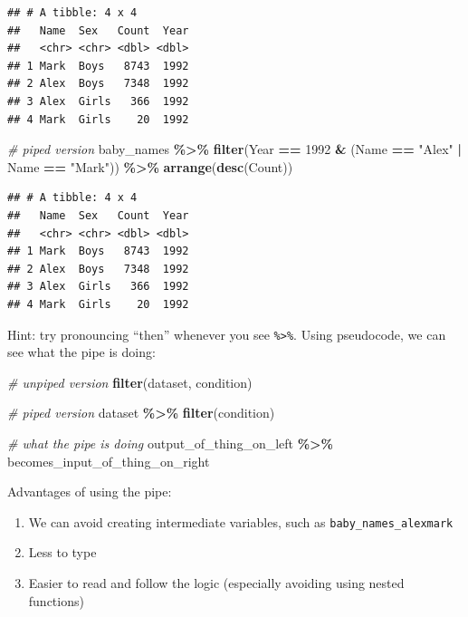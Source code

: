 \documentclass[
]{book}
\newenvironment{Shaded}{\begin{snugshade}}{\end{snugshade}}
\newcommand{\CommentTok}[1]{\textcolor[rgb]{0.56,0.35,0.01}{\textit{#1}}}
\newcommand{\DecValTok}[1]{\textcolor[rgb]{0.00,0.00,0.81}{#1}}
\newcommand{\KeywordTok}[1]{\textcolor[rgb]{0.13,0.29,0.53}{\textbf{#1}}}
\newcommand{\NormalTok}[1]{#1}
\newcommand{\OperatorTok}[1]{\textcolor[rgb]{0.81,0.36,0.00}{\textbf{#1}}}
\newcommand{\StringTok}[1]{\textcolor[rgb]{0.31,0.60,0.02}{#1}}
\providecommand{\tightlist}{%
  \setlength{\itemsep}{0pt}\setlength{\parskip}{0pt}}
\begin{document}
\begin{verbatim}
## # A tibble: 4 x 4
##   Name  Sex   Count  Year
##   <chr> <chr> <dbl> <dbl>
## 1 Mark  Boys   8743  1992
## 2 Alex  Boys   7348  1992
## 3 Alex  Girls   366  1992
## 4 Mark  Girls    20  1992
\end{verbatim}

\begin{Shaded}
\begin{Highlighting}[]
\CommentTok{\# piped version}
\NormalTok{baby\_names }\OperatorTok{\%\textgreater{}\%}\StringTok{ }
\StringTok{  }\KeywordTok{filter}\NormalTok{(Year }\OperatorTok{==}\StringTok{ }\DecValTok{1992} \OperatorTok{\&}\StringTok{ }\NormalTok{(Name }\OperatorTok{==}\StringTok{ "Alex"} \OperatorTok{|}\StringTok{ }\NormalTok{Name }\OperatorTok{==}\StringTok{ "Mark"}\NormalTok{)) }\OperatorTok{\%\textgreater{}\%}
\StringTok{  }\KeywordTok{arrange}\NormalTok{(}\KeywordTok{desc}\NormalTok{(Count))}
\end{Highlighting}
\end{Shaded}

\begin{verbatim}
## # A tibble: 4 x 4
##   Name  Sex   Count  Year
##   <chr> <chr> <dbl> <dbl>
## 1 Mark  Boys   8743  1992
## 2 Alex  Boys   7348  1992
## 3 Alex  Girls   366  1992
## 4 Mark  Girls    20  1992
\end{verbatim}

Hint: try pronouncing ``then'' whenever you see \texttt{\%\textgreater{}\%}. Using pseudocode, we can see what the pipe is doing:

\begin{Shaded}
\begin{Highlighting}[]
\CommentTok{\# unpiped version}
\KeywordTok{filter}\NormalTok{(dataset, condition)}

\CommentTok{\# piped version}
\NormalTok{dataset }\OperatorTok{\%\textgreater{}\%}\StringTok{ }\KeywordTok{filter}\NormalTok{(condition)}

\CommentTok{\# what the pipe is doing}
\NormalTok{output\_of\_thing\_on\_left }\OperatorTok{\%\textgreater{}\%}\StringTok{ }\NormalTok{becomes\_input\_of\_thing\_on\_right}
\end{Highlighting}
\end{Shaded}

Advantages of using the pipe:

\begin{enumerate}
\def\labelenumi{\arabic{enumi}.}
\tightlist
\item
  We can avoid creating intermediate variables, such as \texttt{baby\_names\_alexmark}
\item
  Less to type
\item
  Easier to read and follow the logic (especially avoiding using nested functions)
\end{enumerate}
\end{document}
